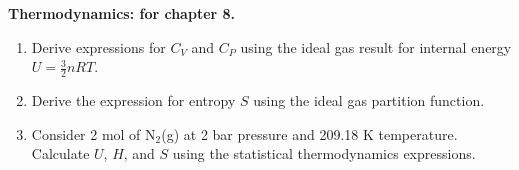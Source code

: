 \noindent
\textbf{Thermodynamics:
 for chapter 8.}\\

\begin{enumerate}

\item Derive expressions for $C_V$ and $C_P$ using the ideal gas result for internal energy $U = \frac{3}{2}nRT$.\\


\item Derive the expression for entropy $S$ using the ideal gas partition function.\\


\item Consider 2 mol of N$_2$(g) at 2 bar pressure and 209.18 K temperature. Calculate $U$, $H$, and $S$ using the statistical thermodynamics expressions.\\


\end{enumerate}
